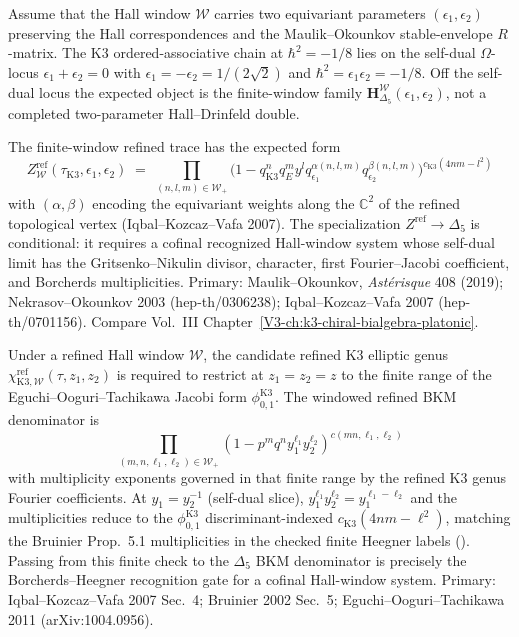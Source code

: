 \begin{remark}
\label{rem:v2-oackd-refined-omega-two-param}
Assume that the Hall window $\mathcal W$ carries two equivariant
parameters $(\epsilon_1,\epsilon_2)$ preserving the Hall correspondences
and the Maulik--Okounkov stable-envelope $R$-matrix.  The K3
ordered-associative chain at $\hbar^2=-1/8$ lies on the self-dual
$\Omega$-locus $\epsilon_1+\epsilon_2=0$ with
$\epsilon_1=-\epsilon_2=1/(2\sqrt2)$ and
$\hbar^2=\epsilon_1\epsilon_2=-1/8$.  Off the self-dual locus the
expected object is the finite-window family
$\mathbf H_{\Delta_5}^{\mathcal W}(\epsilon_1,\epsilon_2)$, not a
completed two-parameter Hall--Drinfeld double.

The finite-window refined trace has the expected form
\[
Z^{\mathrm{ref}}_{\mathcal W}(\tau_{\mathrm K3}, \epsilon_1, \epsilon_2)
 \;=\; \prod_{(n, l, m)\in \mathcal W_+}
 \bigl(1 - q_{\mathrm{K3}}^n q_E^m y^l q_{\epsilon_1}^{\alpha(n,l,m)}
 q_{\epsilon_2}^{\beta(n,l,m)}\bigr)^{c_{\mathrm K3}(4nm - l^2)}
\]
with $(\alpha, \beta)$ encoding the equivariant weights along the
$\mathbb C^2$ of the refined topological vertex (Iqbal--Kozcaz--Vafa
2007).  The specialization $Z^{\mathrm{ref}}\to\Delta_5$ is conditional:
it requires a cofinal recognized Hall-window system whose self-dual
limit has the Gritsenko--Nikulin divisor, character, first
Fourier--Jacobi coefficient, and Borcherds multiplicities.
Primary: Maulik--Okounkov, \emph{Ast\'erisque} 408 (2019);
Nekrasov--Okounkov 2003 (hep-th/0306238); Iqbal--Kozcaz--Vafa 2007
(hep-th/0701156). Compare Vol.~III
Chapter~\ref{V3-ch:k3-chiral-bialgebra-platonic}.
\end{remark}

\begin{remark}
\label{rem:v2-oackd-refined-bkm-product}
Under a refined Hall window $\mathcal W$, the candidate refined K3
elliptic genus
$\chi_{\mathrm{K3},\mathcal W}^{\mathrm{ref}}(\tau,z_1,z_2)$ is required
to restrict at $z_1=z_2=z$ to the finite range of the
Eguchi--Ooguri--Tachikawa Jacobi form $\phi_{0,1}^{\mathrm{K3}}$. The
windowed refined BKM denominator is
\[
\prod_{(m, n, \ell_1, \ell_2)\in \mathcal W_+}
 (1 - p^m q^n y_1^{\ell_1} y_2^{\ell_2})^{c(mn, \ell_1, \ell_2)}
\]
with multiplicity exponents governed in that finite range by the
refined K3 genus Fourier coefficients. At $y_1 = y_2^{-1}$ (self-dual
slice), $y_1^{\ell_1} y_2^{\ell_2}
= y_1^{\ell_1 - \ell_2}$ and the multiplicities reduce to the
$\phi_{0,1}^{\mathrm K3}$ discriminant-indexed $c_{\mathrm K3}(4nm - \ell^2)$,
matching the Bruinier Prop.~5.1 multiplicities in the checked finite
Heegner labels (\cite[Prop.~5.1]{Bruinier2002}). Passing from this
finite check to the $\Delta_5$ BKM denominator is precisely the
Borcherds--Heegner recognition gate for a cofinal Hall-window system.
Primary: Iqbal--Kozcaz--Vafa 2007 Sec.~4;
Bruinier 2002 Sec.~5; Eguchi--Ooguri--Tachikawa 2011 (arXiv:1004.0956).
\end{remark}

